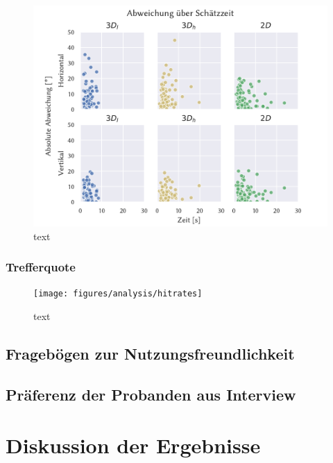 \begin{figure}
    \centering
    \includegraphics[width=\linewidth]{figures/analysis/pointing_times}
    \caption{text}
    \label{fig:pointing_times}
\end{figure}

\subsubsection*{Trefferquote}

\begin{figure}
    \centering
    \texttt{[image: figures/analysis/hitrates]}
    \caption{text}
    \label{fig:hitrates}
\end{figure}

\subsection{Fragebögen zur Nutzungsfreundlichkeit}

\subsection{Präferenz der Probanden aus Interview}

\section{Diskussion der Ergebnisse}

%
\cleardoublepage
